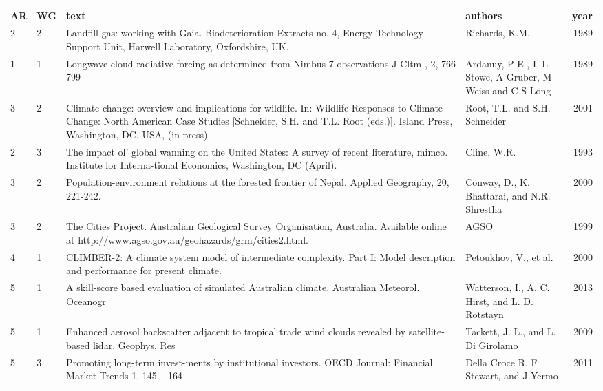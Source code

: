 \begin{tabular}{l l p{4.5cm} p{2.5cm} r}
\toprule
 AR &  WG &                                                                                                                                                                                                                        text &                                                   authors &  year \\
\midrule
 2 &  2 &  Landfill gas: working with Gaia. Biodeterioration Extracts no. 4, Energy Technology Support Unit, Harwell Laboratory, Oxfordshire, UK.  &  Richards, K.M. &  1989 \\
 1 &  1 &  Longwave cloud radiative forcing as determined from Nimbus-7 observations J Cltm , 2, 766 799  &  Ardanuy, P E , L L Stowe, A Gruber, M Weiss and C S Long &  1989 \\
 3 &  2 &  Climate change: overview and implications   for wildlife. In: Wildlife Responses to Climate Change: North American Case   Studies [Schneider, S.H. and T.L. Root (eds.)]. Island Press, Washington, DC,   USA, (in press). &  Root, T.L. and S.H. Schneider &  2001 \\
 2 &  3 &  The impact ol' global wanning on the United States: A survey of recent literature, mimco. Institute lor Interna-tional Economics, Washington, DC (April).  &  Cline, W.R. &  1993 \\
 3 &  2 &  Population-environment   relations at the forested frontier of Nepal. Applied Geography, 20, 221-242. &  Conway, D., K. Bhattarai, and N.R. Shrestha &  2000 \\
 3 &  2 &  The Cities Project. Australian Geological Survey Organisation,   Australia. Available online at http://www.agso.gov.au/geohazards/grm/cities2.html. &  AGSO &  1999 \\
 4 &  1 &  CLIMBER-2: A climate system model of intermediate complexity. Part I: Model description and performance for present climate.  &  Petoukhov, V., et al. &  2000 \\
 5 &  1 &  A skill-score based evaluation of simulated Australian climate. Australian Meteorol. Oceanogr &  Watterson, I., A. C. Hirst, and L. D. Rotstayn &  2013 \\
 5 &  1 &  Enhanced aerosol backscatter adjacent to tropical trade wind clouds revealed by satellite-based lidar. Geophys. Res &  Tackett, J. L., and L. Di Girolamo &  2009 \\
 5 &  3 &  Promoting long-term invest-ments by institutional investors. OECD Journal: Financial Market Trends 1, 145 – 164 &  Della Croce R, F Stewart, and J Yermo &  2011 \\
\bottomrule
\end{tabular}
